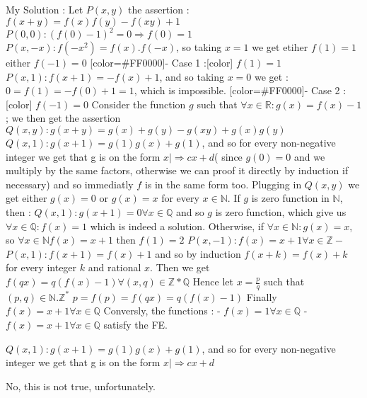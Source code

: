 \begin{solution}
	My Solution :
Let $P(x,y)$ the assertion : $f(x+y)=f(x)f(y)-f(xy)+1$
$P(0,0): (f(0)-1)^{2}=0 \Rightarrow f(0)=1$$
P(x,-x): f(-x^{2})=f(x).f(-x)$, so taking $x=1$ we get etiher $f(1)=1$ either $f(-1)=0$
[color=#FF0000]- Case 1 :[\/color] $f(1)=1$
$P(x,1): f(x+1)=-f(x)+1$, and so taking $x=0$ we get : $0=f(1)=-f(0)+1=1$, which is impossible.
[color=#FF0000]- Case 2 :[\/color] $f(-1)=0$
Consider the function $g$ such that $\forall x \in \mathbb{R} : g(x)=f(x)-1$; we then get the assertion $Q(x,y) : g(x+y)=g(x)+g(y)-g(xy)+g(x)g(y)$ 
$Q(x,1): g(x+1)=g(1)g(x)+g(1)$, and so for every non-negative integer we get that g is on the form $x|\Rightarrow cx+d$( since $g(0)=0$ and we multiply by the same factors, otherwise we can proof it directly by induction if necessary) and so immediatly $f$ is in the same form too.
Plugging in $Q(x,y)$ we get either $g(x)=0$ or $g(x)=x$ for every $x \in \mathbb{N}$.
If $g$ is zero function in $\mathbb{N}$, then :
$Q(x,1): g(x+1)=0 \forall x \in \mathbb{Q}$ and so $g$ is zero function, which give us $\forall x \in \mathbb{Q} : f(x)=1$ which is indeed a solution.
Otherwise, if $\forall x \in \mathbb{N} : g(x)=x$, so $\forall x \in \mathbb{N} f(x)=x+1$ then $f(1)=2$ 
$P(x,-1): f(x)=x+1 \forall x \in \mathbb{Z-}$
$P(x,1):f(x+1)=f(x)+1$ and so by induction $f(x+k)=f(x)+k$ for every integer $k$ and rational $x$.
Then we get $f(qx)=q(f(x)-1) \forall (x,q) \in \mathbb{Z}*\mathbb{Q}$
Hence let $x=\frac{p}{q}$ such that $(p,q) \in \mathbb{N}.\mathbb{Z^{*}}$
$p=f(p)=f(qx)=q(f(x)-1)$
Finally $f(x)=x+1 \forall x \in \mathbb{Q}$
Conversly, the functions :
- $f(x)=1 \forall x \in \mathbb{Q}$
- $f(x)=x+1 \forall x \in \mathbb{Q}$
satisfy the FE.
\end{solution}



\begin{solution}
	\begin{tcolorbox}$Q(x,1): g(x+1)=g(1)g(x)+g(1)$, and so for every non-negative integer we get that g is on the form $x|\Rightarrow cx+d$\end{tcolorbox}
No, this is not true, unfortunately.
\end{solution}






